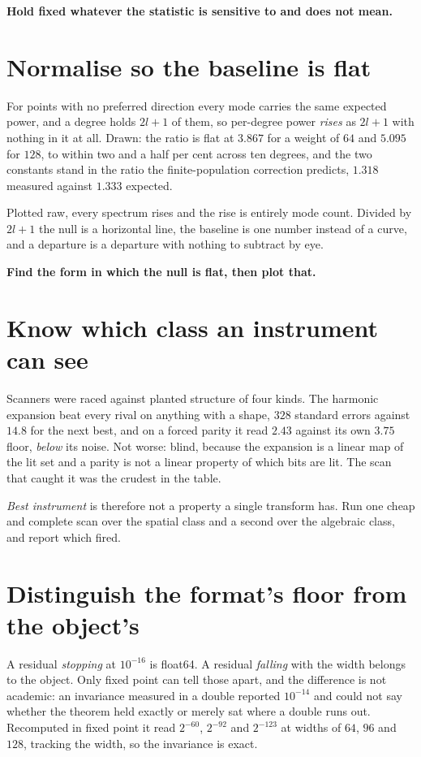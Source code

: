 \textbf{Hold fixed whatever the statistic is sensitive to and does not mean.}

\section{Normalise so the baseline is flat}

For points with no preferred direction every mode carries the same expected power, and a degree holds \(2l+1\) of them, so per-degree power \emph{rises} as \(2l+1\) with nothing in it at all. Drawn: the ratio is flat at \(3.867\) for a weight of \(64\) and \(5.095\) for \(128\), to within two and a half per cent across ten degrees, and the two constants stand in the ratio the finite-population correction predicts, \(1.318\) measured against \(1.333\) expected.

Plotted raw, every spectrum rises and the rise is entirely mode count. Divided by \(2l+1\) the null is a horizontal line, the baseline is one number instead of a curve, and a departure is a departure with nothing to subtract by eye.

\textbf{Find the form in which the null is flat, then plot that.}

\section{Know which class an instrument can see}

Scanners were raced against planted structure of four kinds. The harmonic expansion beat every rival on anything with a shape, \(328\) standard errors against \(14.8\) for the next best, and on a forced parity it read \(2.43\) against its own \(3.75\) floor, \emph{below} its noise. Not worse: blind, because the expansion is a linear map of the lit set and a parity is not a linear property of which bits are lit. The scan that caught it was the crudest in the table.

\emph{Best instrument} is therefore not a property a single transform has. Run one cheap and complete scan over the spatial class and a second over the algebraic class, and report which fired.

\section{Distinguish the format's floor from the object's}

A residual \emph{stopping} at \(10^{-16}\) is float64. A residual \emph{falling} with the width belongs to the object. Only fixed point can tell those apart, and the difference is not academic: an invariance measured in a double reported \(10^{-14}\) and could not say whether the theorem held exactly or merely sat where a double runs out. Recomputed in fixed point it read \(2^{-60}\), \(2^{-92}\) and \(2^{-123}\) at widths of \(64\), \(96\) and \(128\), tracking the width, so the invariance is exact.

